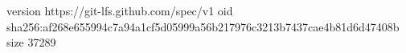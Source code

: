 version https://git-lfs.github.com/spec/v1
oid sha256:af268e655994c7a94a1cf5d05999a56b217976c3213b7437cae4b81d6d47408b
size 37289
